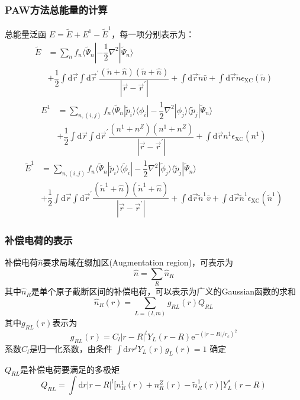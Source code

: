 \documentclass[cjk,slidestop,compress,mathserif,blue]{beamer}
\begin{document}
\frame
{
\frametitle{\textrm{PAW}方法总能量的计算}
总能量泛函
$E=\tilde E+E^1-\tilde E^1$，每一项分别表示为：
\begin{displaymath}
	\begin{aligned}
		\tilde E&=\sum_nf_n\langle\tilde\Psi_n|-\dfrac12\nabla^2|\tilde\Psi_n\rangle\\
		 &+\dfrac12\int\mathrm{d}\vec r\int\mathrm{d}\vec r^{\prime}\dfrac{(\tilde n+\hat n)(\tilde n+\hat n)}{|\vec r-\vec r^{\prime}|}+\int\mathrm{d}\vec r \tilde n\bar v+\int\mathrm{d}\vec r \tilde n\epsilon_{\mathrm{XC}}(\tilde n)
 	\end{aligned}
\end{displaymath}
\begin{displaymath}
	\begin{aligned}
		E^1&=\sum_{n,(i,j)}f_n\langle\tilde\Psi_n|\tilde p_i\rangle\langle\phi_i|-\dfrac12\nabla^2|\phi_j\rangle\langle\tilde p_j|\tilde\Psi_n\rangle\\
		 &+\dfrac12\int\mathrm{d}\vec r\int\mathrm{d}\vec r^{\prime}\dfrac{(n^1+n^Z)(n^1+n^Z)}{|\vec r-\vec r^{\prime}|}+\int\mathrm{d}\vec r n^1\epsilon_{\mathrm{XC}}(n^1)
 	\end{aligned}
\end{displaymath}
\begin{displaymath}
	\begin{aligned}
		\tilde E^1&=\sum_{n,(i,j)}f_n\langle\tilde\Psi_n|\tilde p_i\rangle\langle\tilde\phi_i|-\dfrac12\nabla^2|\tilde\phi_j\rangle\langle\tilde p_j|\tilde\Psi_n\rangle\\
		 &+\dfrac12\int\mathrm{d}\vec r\int\mathrm{d}\vec r^{\prime}\dfrac{(\tilde n^1+\hat n)(\tilde n^1+\hat n)}{|\vec r-\vec r^{\prime}|}+\int\mathrm{d}\vec r \tilde n^1\bar v+\int\mathrm{d}\vec r \tilde n^1\epsilon_{\mathrm{XC}}(\tilde n^1)
 	\end{aligned}
\end{displaymath}
}

\frame
{
	\frametitle{补偿电荷的表示}
	补偿电荷$\hat n$要求局域在缀加区(\textrm{Augmentation region})，可表示为
	$$\hat n=\sum_R\hat n_R$$
	其中$\hat n_R$是单个原子截断区间的补偿电荷，可以表示为广义的\textrm{Gaussian}函数的求和
	$$\hat n_R(r)=\sum_{L=(l,m)}g_{RL}(r)Q_{RL}$$
	其中$g_{RL}(r)$表示为
	$$g_{RL}(r)=C_l|r-R|^lY_L(r-R)\mathrm{e}^{-(|r-R|/r_c)^2}$$
	系数$C_l$是归一化系数，由条件
	$\int\mathrm{d}rr^lY_L(r)g_L(r)=1$
	确定

	$Q_{RL}$是补偿电荷要满足的多极矩
	$$Q_{RL}=\int\mathrm{d}r|r-R|^l\big[n_R^1(r)+n_R^Z(r)-\tilde n_R^1(r)\big]Y_L^{\ast}(r-R)$$
}
\end{document}
